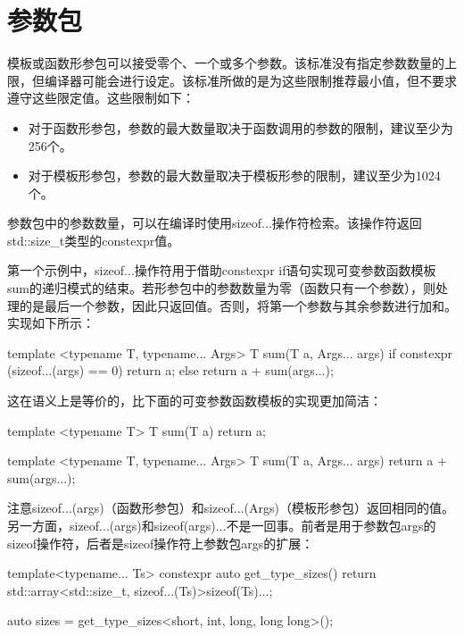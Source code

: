 \section{参数包}

模板或函数形参包可以接受零个、一个或多个参数。该标准没有指定参数数量的上限，但编译器可能会进行设定。该标准所做的是为这些限制推荐最小值，但不要求遵守这些限定值。这些限制如下：

\begin{itemize}
\item
对于函数形参包，参数的最大数量取决于函数调用的参数的限制，建议至少为256个。

\item
对于模板形参包，参数的最大数量取决于模板形参的限制，建议至少为1024个。
\end{itemize}

参数包中的参数数量，可以在编译时使用sizeof...操作符检索。该操作符返回std::size\_t类型的constexpr值。

第一个示例中，sizeof...操作符用于借助constexpr if语句实现可变参数函数模板sum的递归模式的结束。若形参包中的参数数量为零（函数只有一个参数），则处理的是最后一个参数，因此只返回值。否则，将第一个参数与其余参数进行加和。实现如下所示：

\begin{cpp}
template <typename T, typename... Args>
T sum(T a, Args... args)
{
	if constexpr (sizeof...(args) == 0)
		return a;
	else
		return a + sum(args...);
}
\end{cpp}

这在语义上是等价的，比下面的可变参数函数模板的实现更加简洁：

\begin{cpp}
template <typename T>
T sum(T a)
{
	return a;
}

template <typename T, typename... Args>
T sum(T a, Args... args)
{
	return a + sum(args...);
}
\end{cpp}

注意sizeof...(args)（函数形参包）和sizeof...(Args)（模板形参包）返回相同的值。另一方面，sizeof...(args)和sizeof(args)...不是一回事。前者是用于参数包args的sizeof操作符，后者是sizeof操作符上参数包args的扩展：

\begin{cpp}
template<typename... Ts>
constexpr auto get_type_sizes()
{
	return std::array<std::size_t,
	sizeof...(Ts)>{sizeof(Ts)...};
}

auto sizes = get_type_sizes<short, int, long, long long>();
\end{cpp}


